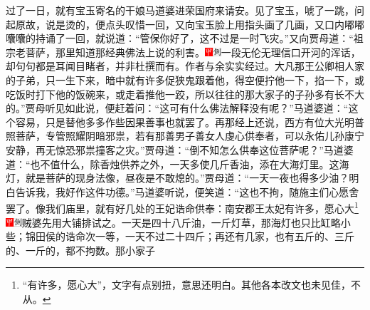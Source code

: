 过了一日，就有宝玉寄名的干娘马道婆进荣国府来请安。见了宝玉，唬了一跳，问起原故，说是烫的，便点头叹惜一回，又向宝玉脸上用指头画了几画，又口内嘟嘟囔囔的持诵了一回，就说道：“管保你好了，这不过是一时飞灾。”又向贾母道：“祖宗老菩萨，那里知道那经典佛法上说的利害。{\includegraphics[width=3mm]{../Images/00002}\includegraphics[width=3mm]{../Images/00011}\footnotesize \kaishu 一段无伦无理信口开河的浑话，却句句都是耳闻目睹者，并非杜撰而有。作者与余实实经过。}大凡那王公卿相人家的子弟，只一生下来，暗中就有许多促狭鬼跟着他，得空便拧他一下，掐一下，或吃饭时打下他的饭碗来，或走着推他一跤，所以往往的那大家子的子孙多有长不大的。”贾母听见如此说，便赶着问：“这可有什么佛法解释没有呢？”马道婆道：“这个容易，只是替他多多作些因果善事也就罢了。再那经上还说，西方有位大光明普照菩萨，专管照耀阴暗邪祟，若有那善男子善女人虔心供奉者，可以永佑儿孙康宁安静，再无惊恐邪祟撞客之灾。”贾母道：“倒不知怎么供奉这位菩萨呢？”马道婆道：“也不值什么，除香烛供养之外，一天多使几斤香油，添在大海灯里。这海灯，就是菩萨的现身法像，昼夜是不敢熄的。”贾母道：“一天一夜也得多少油？明白告诉我，我好作这件功德。”马道婆听说，便笑道：“这也不拘，随施主们心愿舍罢了。像我们庙里，就有好几处的王妃诰命供奉：南安郡王太妃有许多，愿心大\footnote{“有许多，愿心大”，文字有点别扭，意思还明白。其他各本改文也未见佳，不从。}{\includegraphics[width=3mm]{../Images/00002}\includegraphics[width=3mm]{../Images/00011}\footnotesize \kaishu 贼婆先用大铺排试之。}一天是四十八斤油，一斤灯草，那海灯也只比缸略小些；锦田侯的诰命次一等，一天不过二十四斤；再还有几家，也有五斤的、三斤的、一斤的，都不拘数。那小家子